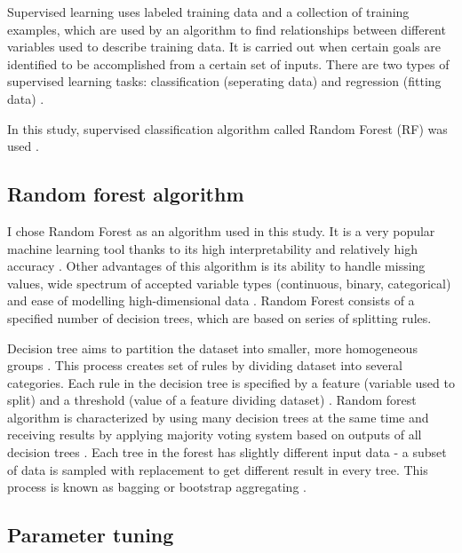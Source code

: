 \documentclass{amuthesis}
\begin{document}
Supervised learning uses labeled training data and a collection of
training examples, which are used by an algorithm to find relationships
between different variables used to describe training data. It is
carried out when certain goals are identified to be accomplished from a
certain set of inputs. There are two types of supervised learning tasks:
classification (seperating data) and regression (fitting data)
\autocite{sarker_machine_2021}.

In this study, supervised classification algorithm called Random Forest
(RF) was used \autocite{breiman_random_2001}.

\hypertarget{sec-rf}{%
\subsection{Random forest algorithm}\label{sec-rf}}

I chose Random Forest as an algorithm used in this study. It is a very
popular machine learning tool thanks to its high interpretability and
relatively high accuracy \autocite{qi_random_2012}. Other advantages of
this algorithm is its ability to handle missing values, wide spectrum of
accepted variable types (continuous, binary, categorical) and ease of
modelling high-dimensional data \autocite{qi_random_2012}. Random Forest
consists of a specified number of decision trees, which are based on
series of splitting rules.

Decision tree aims to partition the dataset into smaller, more
homogeneous groups \autocite{kuhn_applied_2013}. This process creates
set of rules by dividing dataset into several categories. Each rule in
the decision tree is specified by a feature (variable used to split) and
a threshold (value of a feature dividing dataset)
\autocite{sekulic_random_2020}. Random forest algorithm is characterized
by using many decision trees at the same time and receiving results by
applying majority voting system based on outputs of all decision trees
\autocite{kuhn_applied_2013}. Each tree in the forest has slightly
different input data - a subset of data is sampled with replacement to
get different result in every tree. This process is known as bagging or
bootstrap aggregating \autocite{schonlau_random_2020}.

\hypertarget{sec-tuning}{%
\subsection{Parameter tuning}\label{sec-tuning}}
\end{document}
